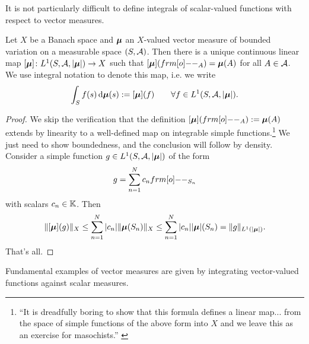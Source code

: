 It is not particularly difficult to define integrals of scalar-valued functions with respect to vector measures.

\begin{prop}
  Let $X$ be a Banach space and $\bm{\mu}$ an $X$-valued vector measure of bounded variation on a measurable space $(S,\mathcal{A})$.
  Then there is a unique continuous linear map $[\bm{\mu}] \colon L^1(S,\mathcal{A},|\bm{\mu}|) \rightarrow X$ such that $[\mb{\mu}](\1_{A}) = \mb{\mu}(A)$ for all $A \in \mathcal{A}$.
  We use integral notation to denote this map, i.e. we write
  \begin{equation*}
    \int_{S} f(s) \, \mathrm{d}\bm{\mu}(s) := [\bm{\mu}](f) \qquad \forall f \in L^1(S,\mathcal{A},|\bm{\mu}|).
  \end{equation*}
\end{prop}

\begin{proof}
  We skip the verification that the definition $[\mb{\mu}](\1_{A}) := \mb{\mu}(A)$ extends by linearity to a well-defined map on integrable simple functions.\footnote{``It is dreadfully boring to show that this formula defines a linear map... from the space of simple functions of the above form into $X$ and we leave this as an exercise for masochists.'' \cite[pp5-6]{DU77}}
  We just need to show boundedness, and the conclusion will follow by density.
  Consider a simple function $g \in L^1(S,\mathcal{A},|\bm{\mu}|)$ of the form
  \begin{equation*}
    g = \sum_{n=1}^{N} c_n \1_{S_n} 
  \end{equation*}
  with scalars $c_n \in \mathbb{K}$.
  Then
  \begin{equation*}
    \begin{aligned}
      \|[\bm{\mu}](g)\|_X \leq \sum_{n=1}^{N} |c_n| \|\bm{\mu}(S_n)\|_X \leq \sum_{n=1}^{N} |c_n| |\bm{\mu}|(S_n) = \|g\|_{L^1(|\bm{\mu}|)}.
    \end{aligned}
  \end{equation*}
  That's all.
\end{proof}

Fundamental examples of vector measures are given by integrating vector-valued functions against scalar measures.

